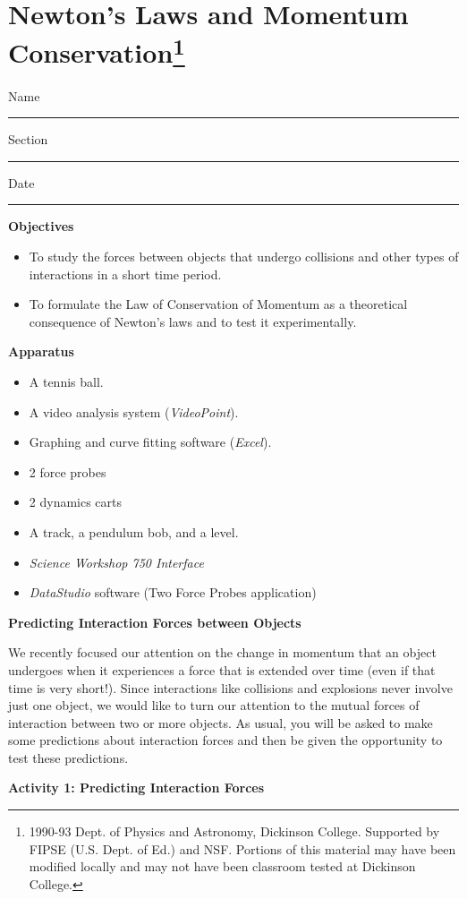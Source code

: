 
\section{Newton's Laws and Momentum Conservation\footnote{
1990-93 Dept. of Physics and Astronomy, Dickinson College. Supported by FIPSE
(U.S. Dept. of Ed.) and NSF. Portions of this material may have been modified
locally and may not have been classroom tested at Dickinson College.
}}

Name \rule{2.0in}{0.1pt}\hfill{}Section \rule{1.0in}{0.1pt}\hfill{}Date \rule{1.0in}{0.1pt}

\textbf{Objectives }

\begin{itemize}
\item To study the forces between objects that undergo collisions and other types
of interactions in a short time period. 
\item To formulate the Law of Conservation of Momentum as a theoretical consequence
of Newton's laws and to test it experimentally.
\end{itemize}
\textbf{Apparatus}

\begin{itemize}
\item A tennis ball. 
\item A video analysis system (\textit{VideoPoint}). 
\item Graphing and curve fitting software (\textit{Excel}). 
\item 2 force probes 
\item 2 dynamics carts 
\item A track, a pendulum bob, and a level.
\item \textit{Science Workshop 750 Interface}
\item \textit{DataStudio} software (Two Force Probes application)
\end{itemize}
\textbf{Predicting Interaction Forces between Objects} 

We recently focused our attention on the change in momentum that an object undergoes
when it experiences a force that is extended over time (even if that time is
very short!). Since interactions like collisions and explosions never involve
just one object, we would like to turn our attention to the mutual forces of
interaction between two or more objects. As usual, you will be asked to make
some predictions about interaction forces and then be given the opportunity
to test these predictions. 

\textbf{Activity 1: Predicting Interaction Forces} 

